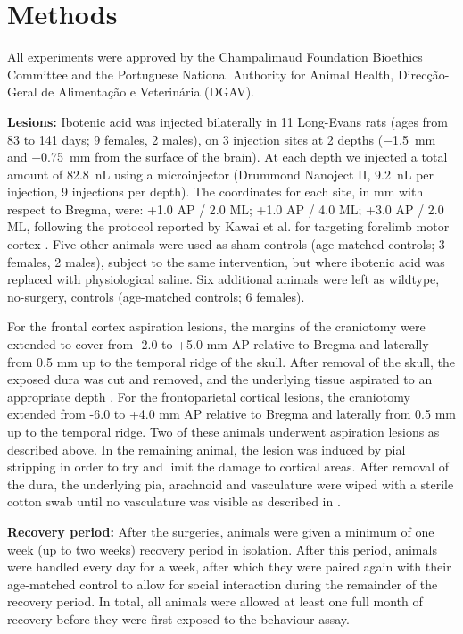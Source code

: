 \section{Methods}

All experiments were approved by the Champalimaud Foundation Bioethics Committee and the Portuguese National Authority for Animal Health, Direcção\hyp{}Geral de Alimentação e Veterinária (DGAV).

\textbf{Lesions:} Ibotenic acid was injected bilaterally in 11 Long-Evans rats (ages from 83 to 141 days; 9 females, 2 males), on 3 injection sites at 2 depths (\SI{-1.5}{\milli\meter} and \SI{-0.75}{\milli\meter} from the surface of the brain). At each depth we injected a total amount of \SI{82.8}{\nano\liter} using a microinjector (Drummond Nanoject II, \SI{9.2}{\nano\liter} per injection, 9 injections per depth). The coordinates for each site, in \si{\milli\meter} with respect to Bregma, were: +1.0 AP / 2.0 ML; +1.0 AP / 4.0 ML; +3.0 AP / 2.0 ML, following the protocol reported by Kawai et al. for targeting forelimb motor cortex \cite{Kawai2015}. Five other animals were used as sham controls (age-matched controls; 3 females, 2 males), subject to the same intervention, but where ibotenic acid was replaced with physiological saline. Six additional animals were left as wildtype, no-surgery, controls (age-matched controls; 6 females).

For the frontal cortex aspiration lesions, the margins of the craniotomy were extended to cover from -2.0 to +5.0 \si{\milli\meter} AP relative to Bregma and laterally from 0.5 \si{\milli\meter} up to the temporal ridge of the skull. After removal of the skull, the exposed dura was cut and removed, and the underlying tissue aspirated to an appropriate depth \cite{Whishaw2000}. For the frontoparietal cortical lesions, the craniotomy extended from -6.0 to +4.0 \si{\milli\meter} AP relative to Bregma and laterally from 0.5 \si{\milli\meter} up to the temporal ridge. Two of these animals underwent aspiration lesions as described above. In the remaining animal, the lesion was induced by pial stripping in order to try and limit the damage to cortical areas. After removal of the dura, the underlying pia, arachnoid and vasculature were wiped with a sterile cotton swab until no vasculature was visible as described in \cite{Farr2002}.

\textbf{Recovery period:} After the surgeries, animals were given a minimum of one week (up to two weeks) recovery period in isolation. After this period, animals were handled every day for a week, after which they were paired again with their age-matched control to allow for social interaction during the remainder of the recovery period. In total, all animals were allowed at least one full month of recovery before they were first exposed to the behaviour assay.


